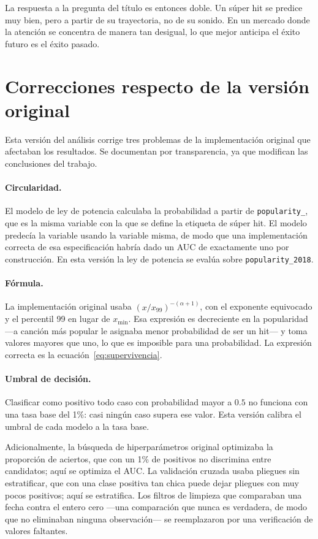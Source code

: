 \documentclass[11pt,a4paper]{article}
\begin{document}
La respuesta a la pregunta del título es entonces doble. Un súper hit se
predice muy bien, pero a partir de su trayectoria, no de su sonido. En un
mercado donde la atención se concentra de manera tan desigual, lo que mejor
anticipa el éxito futuro es el éxito pasado.

\appendix
\section{Correcciones respecto de la versión original}

Esta versión del análisis corrige tres problemas de la implementación
original que afectaban los resultados. Se documentan por transparencia, ya
que modifican las conclusiones del trabajo.

\paragraph{Circularidad.} El modelo de ley de potencia calculaba la
probabilidad a partir de \texttt{popularity\_}, que es la misma variable
con la que se define la etiqueta de súper hit. El modelo predecía la variable
usando la variable misma, de modo que una implementación correcta de esa
especificación habría dado un AUC de exactamente uno por construcción. En
esta versión la ley de potencia se evalúa sobre \texttt{popularity\_2018}.

\paragraph{Fórmula.} La implementación original usaba
$(x/x_{99})^{-(\alpha+1)}$, con el exponente equivocado y el percentil 99 en
lugar de $x_{\min}$. Esa expresión es decreciente en la popularidad ---a
canción más popular le asignaba menor probabilidad de ser un hit--- y toma
valores mayores que uno, lo que es imposible para una probabilidad. La
expresión correcta es la ecuación~\eqref{eq:supervivencia}.

\paragraph{Umbral de decisión.} Clasificar como positivo todo caso con
probabilidad mayor a $0.5$ no funciona con una tasa base del 1\%: casi ningún
caso supera ese valor. Esta versión calibra el umbral de cada modelo a la
tasa base.

Adicionalmente, la búsqueda de hiperparámetros original optimizaba la
proporción de aciertos, que con un 1\% de positivos no discrimina entre
candidatos; aquí se optimiza el AUC. La validación cruzada usaba pliegues sin
estratificar, que con una clase positiva tan chica puede dejar pliegues con muy
pocos positivos; aquí se estratifica. Los filtros de limpieza que comparaban
una fecha contra el entero cero ---una comparación que nunca es verdadera, de
modo que no eliminaban ninguna observación--- se reemplazaron por una
verificación de valores faltantes.


\end{document}
